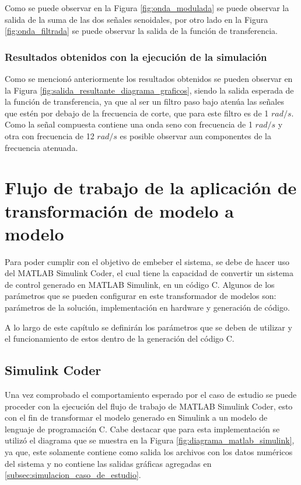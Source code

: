 Como se puede observar en la Figura \ref{fig:onda_modulada} se puede observar la salida de la suma de las dos señales senoidales, por otro lado en la Figura \ref{fig:onda_filtrada} se puede observar la salida de la función de transferencia.

\subsubsection{Resultados obtenidos con la ejecución de la simulación}

Como se mencionó anteriormente los resultados obtenidos se pueden observar en la Figura \ref{fig:salida_resultante_diagrama_graficos}, siendo la salida esperada de la función de transferencia, ya que al ser un filtro paso bajo atenúa las señales que estén por debajo de la frecuencia de corte, que para este filtro es de 1 $rad/s$. Como la señal compuesta contiene una onda seno con frecuencia de 1 $rad/s$ y otra con frecuencia de 12 $rad/s$ es posible observar aun componentes de la frecuencia atenuada.

\section{Flujo de trabajo de la aplicación de transformación de modelo a modelo}

Para poder cumplir con el objetivo de embeber el sistema, se debe de hacer uso del MATLAB Simulink Coder, el cual tiene la capacidad de convertir un sistema de control generado en MATLAB Simulink, en un código C. Algunos de los parámetros que se pueden configurar en este transformador de modelos son: parámetros de la solución, implementación en hardware y generación de código.

A lo largo de este capítulo se definirán los parámetros que se deben de utilizar y el funcionamiento de estos dentro de la generación del código C.

\subsection{Simulink Coder}\label{subsec:simulink_coder}

Una vez comprobado el comportamiento esperado por el caso de estudio se puede proceder con la ejecución del flujo de trabajo de MATLAB Simulink Coder, esto con el fin de transformar el modelo generado en Simulink a un modelo de lenguaje de programación C. Cabe destacar que para esta implementación se utilizó el diagrama que se muestra en la Figura \ref{fig:diagrama_matlab_simulink}, ya que, este solamente contiene como salida los archivos con los datos numéricos del sistema y no contiene las salidas gráficas agregadas en \ref{subsec:simulacion_caso_de_estudio}.


